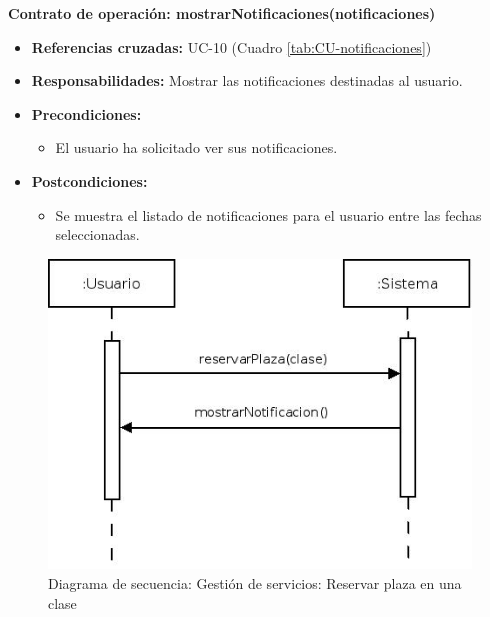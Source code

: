 \textbf{Contrato de operación: mostrarNotificaciones(notificaciones)}
\begin{itemize}
\item \textbf{Referencias cruzadas:} UC-10 (Cuadro \ref{tab:CU-notificaciones})
\item \textbf{Responsabilidades:} Mostrar las notificaciones destinadas al usuario.
\item \textbf{Precondiciones:} 
 \begin{itemize}
\item El usuario ha solicitado ver sus notificaciones.
\end {itemize}
\item \textbf{Postcondiciones:} 
 \begin{itemize}
\item Se muestra el listado de notificaciones para el usuario entre las fechas seleccionadas.
\end {itemize}
\end {itemize}


\vspace{7mm}
\dotfill
\vspace{7mm}

\begin{figure}[h!]
\centering
  \includegraphics[scale=.55]{img/secuencias/gestion-servicios-reservar-clase.jpeg}
  \caption{Diagrama de secuencia: Gestión de servicios: Reservar plaza en una clase}
  \label{fig:secuencia-gestion-servicios-reservar-clase}
\end{figure}

